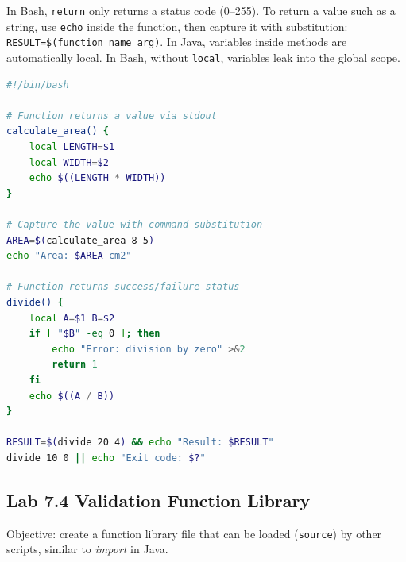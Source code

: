 \begin{notebox}
In Bash, \texttt{return} only returns a status code (0--255). To return a
value such as a string, use \texttt{echo} inside the function, then capture
it with substitution: \texttt{RESULT=\$(function\_name arg)}. In Java,
variables inside methods are automatically local. In Bash, without
\texttt{local}, variables leak into the global scope.
\end{notebox}

\begin{lstlisting}[language=bash, caption={Defining and calling functions}]
#!/bin/bash

# Function returns a value via stdout
calculate_area() {
    local LENGTH=$1
    local WIDTH=$2
    echo $((LENGTH * WIDTH))
}

# Capture the value with command substitution
AREA=$(calculate_area 8 5)
echo "Area: $AREA cm2"

# Function returns success/failure status
divide() {
    local A=$1 B=$2
    if [ "$B" -eq 0 ]; then
        echo "Error: division by zero" >&2
        return 1
    fi
    echo $((A / B))
}

RESULT=$(divide 20 4) && echo "Result: $RESULT"
divide 10 0 || echo "Exit code: $?"
\end{lstlisting}

\subsection*{Lab 7.4 Validation Function Library}

Objective: create a function library file that can be loaded
(\texttt{source}) by other scripts, similar to \textit{import} in Java.

